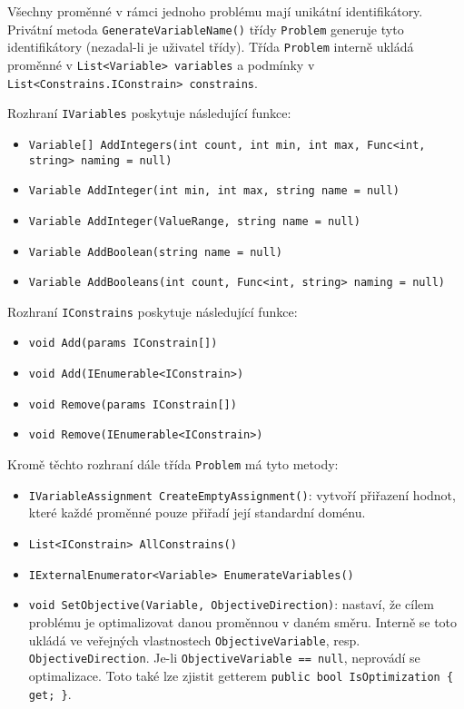 \documentclass[a4paper]{article}
\begin{document}
Všechny proměnné v rámci jednoho problému mají unikátní identifikátory.
Privátní metoda \texttt{GenerateVariableName()} třídy \texttt{Problem} generuje
tyto identifikátory (nezadal-li je uživatel třídy).
Třída \texttt{Problem} interně ukládá proměnné v \texttt{List<Variable>
variables} a podmínky v \texttt{List<Constrains.IConstrain> constrains}.

Rozhraní \texttt{IVariables} poskytuje následující funkce:
\begin{itemize}
\item \texttt{Variable[] AddIntegers(int count, int min, int max, Func<int,
	string> naming = null)}
\item \texttt{Variable AddInteger(int min, int max, string name = null)}
\item \texttt{Variable AddInteger(ValueRange, string name = null)}
\item \texttt{Variable AddBoolean(string name = null)}
\item \texttt{Variable AddBooleans(int count, Func<int, string> naming = null)}
\end{itemize}

Rozhraní \texttt{IConstrains} poskytuje následující funkce:
\begin{itemize}
\item \texttt{void Add(params IConstrain[])}
\item \texttt{void Add(IEnumerable<IConstrain>)}
\item \texttt{void Remove(params IConstrain[])}
\item \texttt{void Remove(IEnumerable<IConstrain>)}
\end{itemize}

Kromě těchto rozhraní dále třída \texttt{Problem} má tyto metody:
\begin{itemize}
\item \texttt{IVariableAssignment CreateEmptyAssignment()}:
	vytvoří přiřazení hodnot, které každé proměnné pouze přiřadí její
	standardní doménu.
\item \texttt{List<IConstrain> AllConstrains()}
\item \texttt{IExternalEnumerator<Variable> EnumerateVariables()}
\item \texttt{void SetObjective(Variable, ObjectiveDirection)}:
	nastaví, že cílem problému je optimalizovat danou proměnnou v daném
	směru.
	Interně se toto ukládá ve veřejných vlastnostech
	\texttt{ObjectiveVariable}, resp. \texttt{ObjectiveDirection}. Je-li
	\texttt{ObjectiveVariable == null}, neprovádí se optimalizace. Toto také
	lze zjistit getterem \texttt{public bool IsOptimization \{ get; \}}.
\end{itemize}
\end{document}
